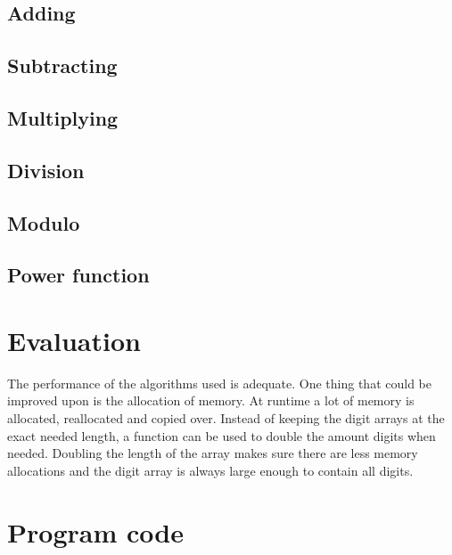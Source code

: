 \documentclass[a4paper,11pt]{article}
\begin{document}
\subsection{Adding}

\subsection{Subtracting}

\subsection{Multiplying}

\subsection{Division}

\subsection{Modulo}

\subsection{Power function}

\section{Evaluation}
The performance of the algorithms used is adequate.
One thing that could be improved upon is the allocation of memory.
At runtime a lot of memory is allocated, reallocated and copied over.
Instead of keeping the digit arrays at the exact needed length, a function can be used to double the amount digits when needed.
Doubling the length of the array makes sure there are less memory allocations and the digit array is always large enough to contain all digits.

\section{Program code}
\end{document}
